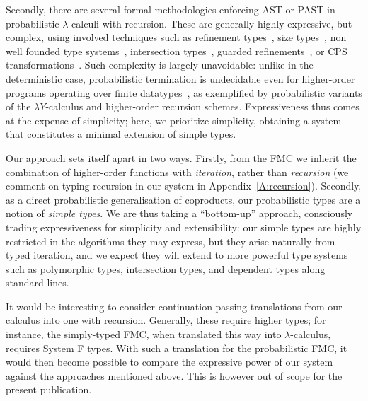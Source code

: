 \documentclass[a4paper,UKenglish,cleveref, autoref, thm-restate]{lipics-v2021}
\begin{document}
Secondly, there are several formal methodologies enforcing AST or PAST in probabilistic $\lambda$-calculi with recursion. These are generally highly expressive, but complex, using involved techniques such as refinement types~\cite{Avanzini-DalLago-Ghyselen-2019,Kura-Unno-2024}, size types~\cite{DalLago-Grellois-2019}, non well founded type systems~\cite{DalLago-Padovani-2024,Das-Wang-Hoffmann-2023}, intersection types~\cite{Beutner-Ong-2021,DalLago-Faggian-Ronchi-2021}, guarded refinements~\cite{Gregersen-Aguirre-Haselwarter-Tassarotti-Birkedal-2024}, or CPS transformations~\cite{Avanzini-Barthe-DalLago-2021}. Such complexity is largely unavoidable: unlike in the deterministic case, probabilistic termination is undecidable even for higher-order programs operating over finite datatypes~\cite{Kobayashi-DalLago-Grellois-2020}, as exemplified by probabilistic variants of the $\lambda Y$-calculus and higher-order recursion schemes. Expressiveness thus comes at the expense of simplicity; here, we prioritize simplicity, obtaining a system that constitutes a minimal extension of simple types.

Our approach sets itself apart in two ways. Firstly, from the FMC we inherit the combination of higher-order functions with \emph{iteration}, rather than \emph{recursion} (we comment on typing recursion in our system in Appendix~\ref{A:recursion}). Secondly, as a direct probabilistic generalisation of coproducts, our probabilistic types are a notion of \emph{simple types}. We are thus taking a ``bottom-up'' approach, consciously trading expressiveness for simplicity and extensibility: our simple types are highly restricted in the algorithms they may express, but they arise naturally from typed iteration, and we expect they will extend to more powerful type systems such as polymorphic types, intersection types, and dependent types along standard lines.

It would be interesting to consider continuation-passing translations from our calculus into one with recursion. Generally, these require higher types; for instance, the simply-typed FMC, when translated this way into $\lambda$-calculus, requires System F types. With such a translation for the probabilistic FMC, it would then become possible to compare the expressive power of our system against the approaches  mentioned above. This is however out of scope for the present publication.

\end{document}

